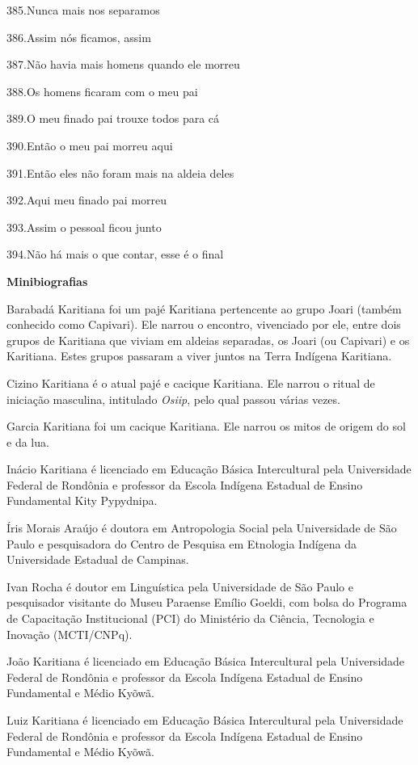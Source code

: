 385.Nunca mais nos separamos

386.Assim nós ficamos, assim

387.Não havia mais homens quando ele morreu

388.Os homens ficaram com o meu pai

389.O meu finado pai trouxe todos para cá

390.Então o meu pai morreu aqui

391.Então eles não foram mais na aldeia deles

392.Aqui meu finado pai morreu

393.Assim o pessoal ficou junto

394.Não há mais o que contar, esse é o final

\textbf{Minibiografias}

Barabadá Karitiana foi um pajé Karitiana pertencente ao grupo Joari
(também conhecido como Capivari). Ele narrou o encontro, vivenciado por
ele, entre dois grupos de Karitiana que viviam em aldeias separadas, os
Joari (ou Capivari) e os Karitiana. Estes grupos passaram a viver juntos
na Terra Indígena Karitiana.

Cizino Karitiana é o atual pajé e cacique Karitiana. Ele narrou o ritual
de iniciação masculina, intitulado \emph{Osiip}, pelo qual passou várias
vezes.

Garcia Karitiana foi um cacique Karitiana. Ele narrou os mitos de origem
do sol e da lua.

Inácio Karitiana é licenciado em Educação Básica Intercultural pela
Universidade Federal de Rondônia e professor da Escola Indígena Estadual
de Ensino Fundamental Kity Pypydnipa.

Íris Morais Araújo é doutora em Antropologia Social pela Universidade de
São Paulo e pesquisadora do Centro de Pesquisa em Etnologia Indígena da
Universidade Estadual de Campinas.

Ivan Rocha é doutor em Linguística pela Universidade de São Paulo e
pesquisador visitante do Museu Paraense Emílio Goeldi, com bolsa do
Programa de Capacitação Institucional (PCI) do Ministério da Ciência,
Tecnologia e Inovação (MCTI/CNPq).

João Karitiana é licenciado em Educação Básica Intercultural pela
Universidade Federal de Rondônia e professor da Escola Indígena Estadual
de Ensino Fundamental e Médio Kyõwã.

Luiz Karitiana é licenciado em Educação Básica Intercultural pela
Universidade Federal de Rondônia e professor da Escola Indígena Estadual
de Ensino Fundamental e Médio Kyõwã.

